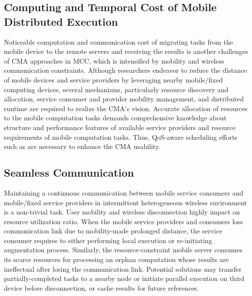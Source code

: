 \documentclass[publish]{IEEEtran}
\begin{document}
\subsection{Computing and Temporal Cost of Mobile Distributed Execution}
Noticeable computation and communication cost of migrating tasks from the mobile device to the remote servers and receiving the results is another challenges of CMA approaches in MCC, which is intensified by mobility and wireless communication constraints. Although researchers \cite{MOMCC, hyrax} endeavor to reduce the distance of mobile devices and service providers by leveraging nearby mobile/fixed computing devices, several mechanisms, particularly resource discovery and allocation, service consumer and provider mobility management, and distributed runtime are required to realize the CMA’s vision. Accurate allocation of resources to the mobile computation tasks demands comprehensive knowledge about structure and performance features of available service providers and resource requirements of mobile computation tasks. Thus, QoS-aware scheduling efforts such as \cite{Rahimi2012} are necessary to enhance the CMA usability.
 
\subsection{Seamless Communication} 
Maintaining a continuous communication between mobile service consumers and mobile/fixed service providers in intermittent heterogeneous wireless environment is a non-trivial task. User mobility and wireless disconnection highly impact on resource utilization ratio. When the mobile service providers and consumers loss communication link due to mobility-made prolonged distance, the service consumer requires to either performing local execution or re-initiating augmentation process. Similarly, the resource-constraint mobile server consumes its scarce resources for processing an orphan computation whose results are ineffectual after losing the communication link. Potential solutions may transfer partially-completed tasks to a nearby node or initiate parallel execution on third device before disconnection, or cache results for future references.
\end{document}
